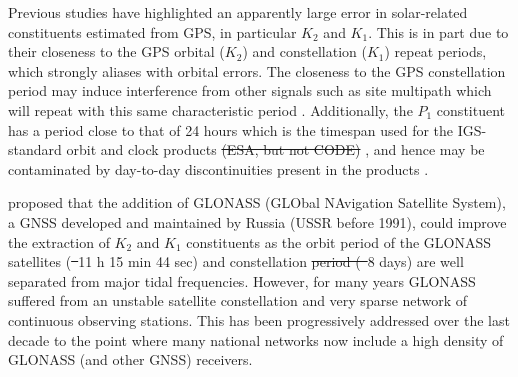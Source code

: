 \documentclass[se, manuscript]{copernicus}
\providecommand{\DIFadd}[1]{{\protect\color{blue}\uwave{#1}}} %
\providecommand{\DIFdel}[1]{{\protect\color{red}\sout{#1}}}                      %
\providecommand{\DIFaddbegin}{} %
\providecommand{\DIFaddend}{} %
\providecommand{\DIFdelbegin}{} %
\providecommand{\DIFdelend}{} %
\begin{document}
Previous studies have highlighted an apparently large error in solar-related constituents estimated from GPS, in particular $K_2$ and $K_1$. This is in part due to their closeness to the GPS orbital ($K_2$) and constellation ($K_1$) repeat periods, which strongly aliases with orbital errors. The closeness to the GPS constellation \DIFaddbegin \DIFadd{repeat }\DIFaddend period may induce interference from other signals such as site multipath which will repeat with this same characteristic period \citep{Schenewerk2001,Urschl2005,Thomas2006}. Additionally, the $P_1$ constituent has a period close to that of 24 hours which is the timespan used for the IGS-standard orbit and clock products \DIFdelbegin \DIFdel{(ESA, but not CODE) }\DIFdelend \citep{Griffiths2009}, and hence may be contaminated by day-to-day discontinuities present in the products \citep{Ito2011}.

\cite{Urschl2005} proposed that the addition of GLONASS (GLObal NAvigation Satellite System), a GNSS developed and maintained by Russia (USSR before 1991), could improve the extraction of $K_2$ and $K_1$ constituents as the orbit period of the GLONASS satellites (\DIFdelbegin \DIFdel{~}\DIFdelend \DIFaddbegin \DIFadd{$\sim$}\DIFaddend 11 h 15 min 44 sec) and constellation \DIFdelbegin \DIFdel{period (~}\DIFdelend \DIFaddbegin \DIFadd{repeat period ($\sim$}\DIFaddend 8 days) are well separated from major tidal frequencies. However, for many years GLONASS suffered from an unstable satellite constellation and very sparse network of continuous observing stations. This has been progressively addressed over the last decade to the point where many national networks now include a high density of GLONASS (and other GNSS) receivers.
\end{document}
